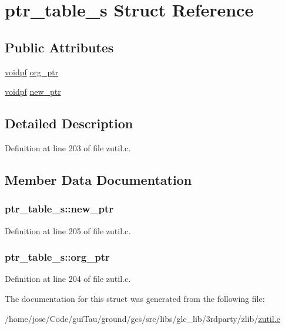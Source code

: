 \hypertarget{structptr__table__s}{\section{ptr\-\_\-table\-\_\-s Struct Reference}
\label{structptr__table__s}
}
\subsection*{Public Attributes}
\begin{DoxyCompactItemize}
\item 
\hyperlink{zconf_8h_aa0944432a046192e6602e13ec126acaa}{voidpf} \hyperlink{structptr__table__s_a52c2fb015234e86b3ce0117d7ab5ddfb}{org\-\_\-ptr}
\item 
\hyperlink{zconf_8h_aa0944432a046192e6602e13ec126acaa}{voidpf} \hyperlink{structptr__table__s_aea7189684c9014c64fe6bde080bfd022}{new\-\_\-ptr}
\end{DoxyCompactItemize}


\subsection{Detailed Description}


Definition at line 203 of file zutil.\-c.



\subsection{Member Data Documentation}
\hypertarget{structptr__table__s_aea7189684c9014c64fe6bde080bfd022}{
\subsubsection[{new\-\_\-ptr}]{ ptr\-\_\-table\-\_\-s\-::new\-\_\-ptr}}\label{structptr__table__s_aea7189684c9014c64fe6bde080bfd022}


Definition at line 205 of file zutil.\-c.

\hypertarget{structptr__table__s_a52c2fb015234e86b3ce0117d7ab5ddfb}{
\subsubsection[{org\-\_\-ptr}]{ ptr\-\_\-table\-\_\-s\-::org\-\_\-ptr}}\label{structptr__table__s_a52c2fb015234e86b3ce0117d7ab5ddfb}


Definition at line 204 of file zutil.\-c.



The documentation for this struct was generated from the following file\-:\begin{DoxyCompactItemize}
\item 
/home/jose/\-Code/gui\-Tau/ground/gcs/src/libs/glc\-\_\-lib/3rdparty/zlib/\hyperlink{zutil_8c}{zutil.\-c}\end{DoxyCompactItemize}

